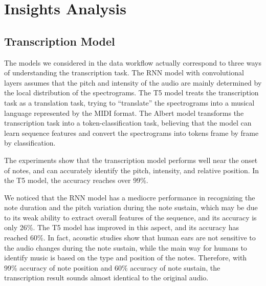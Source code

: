 \documentclass{article}
\begin{document}
\section{Insights Analysis}

\subsection{Transcription Model}

The models we considered in the data workflow actually correspond to three ways of understanding the transcription task. The RNN model with convolutional layers assumes that the pitch and intensity of the audio are mainly determined by the local distribution of the spectrograms. The T5 model treats the transcription task as a translation task, trying to “translate” the spectrograms into a musical language represented by the MIDI format. The Albert model transforms the transcription task into a token-classification task, believing that the model can learn sequence features and convert the spectrograms into tokens frame by frame by classification.

The experiments show that the transcription model performs well near the onset of notes, and can accurately identify the pitch, intensity, and relative position. In the T5 model, the accuracy reaches over 99\%. 

We noticed that the RNN model has a mediocre performance in recognizing the note duration and the pitch variation during the note sustain, which may be due to its weak ability to extract overall features of the sequence, and its accuracy is only 26\%. The T5 model has improved in this aspect, and its accuracy has reached 60\%. In fact, acoustic studies show that human ears are not sensitive to the audio changes during the note sustain, while the main way for humans to identify music is based on the type and position of the notes. Therefore, with 99\% accuracy of note position and 60\% accuracy of note sustain, the transcription result sounds almost identical to the original audio.
\end{document}
